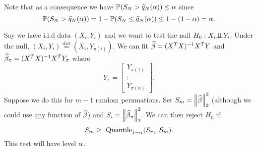 Note that as a consequence we have ${\mathbb{P}}(S_N > \widehat{q}_N({\alpha})) \le {\alpha}$ since
\[{\mathbb{P}}(S_N > \widehat{q}_N({\alpha})) = 1-{\mathbb{P}}(S_N \le \widehat{q}_N({\alpha})) \le 1-(1-{\alpha})={\alpha}. \]
\begin{ex}
    Say we have i.i.d data $(X_i,Y_i)$ and we want to test the null $H_0 : X_i {\perp\!\!\!\perp} Y_i$. Under the null, $(X_i,Y_i) \stackrel{\text{dist}}{=} (X_i,Y_{\pi(i)})$. We can fit $\widehat{\beta}=(X^TX)^{-1}X^TY$ and $\widehat{\beta}_\pi = (X^TX)^{-1}X^TY_\pi$ where
    \[Y_\pi = \begin{bmatrix}
        Y_{\pi(1)}\\ \vdots \\ Y_{\pi(n)}
    \end{bmatrix}.\]
    Suppose we do this for $m-1$ random permuations. Set $S_m = \left\|\widehat{\beta}\right\|_2^2$ (although we could use \underline{any} function of $\widehat{\beta}$) and $S_i = \left\|\widehat{\beta}_{\pi}\right\|_2^2$. We can then reject $H_0$ if 
    \[S_m \ge \text{ Quantile}_{1-{\alpha}}(S_{\pi_i},S_m).\]
    This test will have level ${\alpha}$.
\end{ex}
